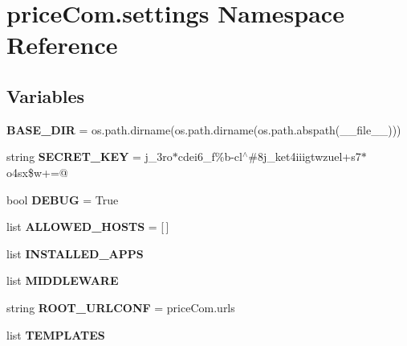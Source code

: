 \hypertarget{namespacepriceCom_1_1settings}{}\section{price\+Com.\+settings Namespace Reference}
\label{namespacepriceCom_1_1settings}
\subsection*{Variables}
\begin{DoxyCompactItemize}
\item 
\mbox{\label{namespacepriceCom_1_1settings_ad754336fcabb7a34a70ff6ec0fc59fc6}} 
{\bfseries B\+A\+S\+E\+\_\+\+D\+IR} = os.\+path.\+dirname(os.\+path.\+dirname(os.\+path.\+abspath(\+\_\+\+\_\+file\+\_\+\+\_\+)))
\item 
\mbox{\label{namespacepriceCom_1_1settings_a26fffeb18144e452a9534617885bdc0e}} 
string {\bfseries S\+E\+C\+R\+E\+T\+\_\+\+K\+EY} = \textquotesingle{}j\+\_\+3ro$\ast$cdei6\+\_\+f\%b-\/cl$^\wedge$\#8j\+\_\+ket4iiigtwzuel+s7$\ast$o4sx\$w+=@\textquotesingle{}
\item 
\mbox{\label{namespacepriceCom_1_1settings_a4d22a6aecf78021d681d4e2d7652d738}} 
bool {\bfseries D\+E\+B\+UG} = True
\item 
\mbox{\label{namespacepriceCom_1_1settings_a8d9ea6720c0ec4e861fa310c8da93bab}} 
list {\bfseries A\+L\+L\+O\+W\+E\+D\+\_\+\+H\+O\+S\+TS} = \mbox{[}$\,$\mbox{]}
\item 
list {\bfseries I\+N\+S\+T\+A\+L\+L\+E\+D\+\_\+\+A\+P\+PS}
\item 
list {\bfseries M\+I\+D\+D\+L\+E\+W\+A\+RE}
\item 
\mbox{\label{namespacepriceCom_1_1settings_ad66fc1e96e6703e67f8a4ee88f6f42c2}} 
string {\bfseries R\+O\+O\+T\+\_\+\+U\+R\+L\+C\+O\+NF} = \textquotesingle{}price\+Com.\+urls\textquotesingle{}
\item 
list {\bfseries T\+E\+M\+P\+L\+A\+T\+ES}
\item 
\mbox{\label{namespacepriceCom_1_1settings_ad6adfb15c3cc8f10ebe71d318be7352f}} 

\end{DoxyCompactItemize}
